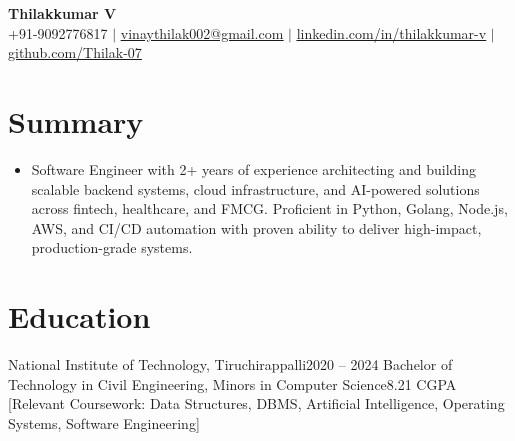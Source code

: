 \documentclass[letterpaper,11pt]{article}
\newcommand{\resumeSubHeadingListStart}{\begin{itemize}[leftmargin=0.15in, label={}]}
\newcommand{\resumeSubHeadingListEnd}{\end{itemize}}
\begin{document}
\begin{center}
    \textbf{\Huge Thilakkumar V} \\ \vspace{2pt}
    {\raisebox{0.0\height}{\footnotesize \faPhone}
    \footnotesize +91-9092776817} $|$
    \href{mailto:vinaythilak002@gmail.com}
    {\raisebox{-0.1\height}{\footnotesize \faEnvelope}
    \footnotesize \underline{vinaythilak002@gmail.com}} $|$ 
    \href{https://www.linkedin.com/in/thilakkumar-v-65610a200/}
    {\raisebox{-0.1\height}{\footnotesize \faLinkedin}
    \footnotesize \underline{linkedin.com/in/thilakkumar-v}} $|$
    \href{https://github.com/Thilak-07}
    {\raisebox{-0.1\height}{\footnotesize \faGithub}
    \footnotesize \underline{github.com/Thilak-07}}
\end{center}


\section{Summary}
  \begin{itemize}[leftmargin=0.15in, label={}]
    \small \item{
      Software Engineer with 2+ years of experience architecting and building scalable backend systems, cloud infrastructure, and AI-powered solutions across fintech, healthcare, and FMCG. Proficient in Python, Golang, Node.js, AWS, and CI/CD automation with proven ability to deliver high-impact, production-grade systems.
    } \vspace{-5pt}
  \end{itemize}


\section{Education}
  \resumeSubHeadingListStart
    \resumeSubheading
      {National Institute of Technology, Tiruchirappalli}{2020 -- 2024}
      {Bachelor of Technology in Civil Engineering, Minors in Computer Science}{8.21 CGPA}
      [Relevant Coursework: Data Structures, DBMS, Artificial Intelligence, Operating Systems, Software Engineering]
  \resumeSubHeadingListEnd
\end{document}
